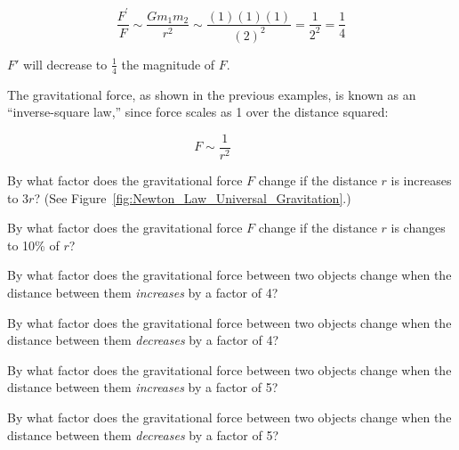 \documentclass{article}
\begin{document}
\begin{equation*}
    \frac{F^{\prime}}{F} \sim \frac{G m_1 m_2}{r^2} \sim \frac{(1)(1)(1)}{(2)^2} = \frac{1}{2^2} =\frac{1}{4}
\end{equation*}

$F'$ will decrease to $\frac{1}{4}$ the magnitude of $F$.

\vspace{1ex}
\cyanhrule
\vspace{1ex}

The gravitational force, as shown in the previous examples, is known as an ``inverse-square law,'' since force scales as 1 over the distance squared:

\begin{equation*} \tag{inverse-square law}
    F \sim \frac{1}{r^2} \hspace{3em}
\end{equation*}

\begin{exercise} \label{WhkfQ4}
By what factor does the gravitational force $F$ change if the distance $r$ is increases to $3r$? (See Figure~\ref{fig:Newton_Law_Universal_Gravitation}.) 
\end{exercise}

\begin{exercise} \label{CqOs7y}
By what factor does the gravitational force $F$ change if the distance $r$ is changes to 10\% of $r$? 
\end{exercise}

\begin{exercise} \label{PwaIbN}
By what factor does the gravitational force between two objects change when the distance between them \textit{increases} by a factor of 4?
\end{exercise}

\begin{exercise} \label{akw9Hx}
By what factor does the gravitational force between two objects change when the distance between them \textit{decreases} by a factor of 4?
\end{exercise}

\begin{exercise} \label{Dhfy9M}
By what factor does the gravitational force between two objects change when the distance between them \textit{increases} by a factor of 5?
\end{exercise}

\begin{exercise} \label{gjeHTU}
By what factor does the gravitational force between two objects change when the distance between them \textit{decreases} by a factor of 5?
\end{exercise}
\end{document}
